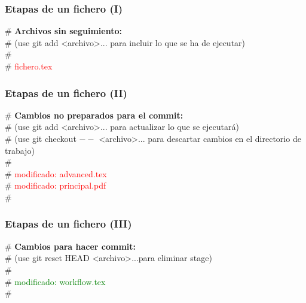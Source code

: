 \frame
{
\frametitle{Etapas de un fichero (I)}
\# \textbf{Archivos sin seguimiento:}\\
\#   (use git add <archivo>... para incluir lo que se ha de ejecutar)\\
\#\\
\#	\textcolor{red}{fichero.tex}\\
}

\frame
{
\frametitle{Etapas de un fichero (II)}
\# \textbf{Cambios no preparados para el commit:}\\
\#   (use git add <archivo>... para actualizar lo que se ejecutará)\\
\#   (use git checkout $--$ <archivo>... para descartar cambios en el directorio de trabajo)\\
\#\\
\#	\textcolor{red}{modificado:   advanced.tex}\\
\#	\textcolor{red}{modificado:   principal.pdf}\\
\#\\
}

\frame
{
\frametitle{Etapas de un fichero (III)}
\# \textbf{Cambios para hacer commit:}\\
\#   (use git reset HEAD <archivo>...para eliminar stage)\\
\#\\
\#	\textcolor{green}{modificado:   workflow.tex}\\
\#\\
}
